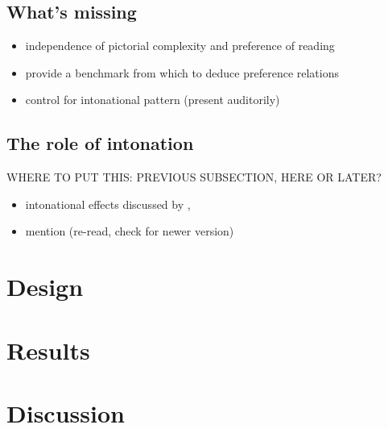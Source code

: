 \documentclass[fleqn,reqno,10pt,draft]{article}
\begin{document}
\subsection{What's missing}
\label{sec:whats-missing}

\begin{itemize}
\item independence of pictorial complexity and preference of reading
\item provide a benchmark from which to deduce preference relations
\item control for intonational pattern (present auditorily)
\end{itemize}


\subsection{The role of intonation}
\label{sec:role-intonation}

WHERE TO PUT THIS: PREVIOUS SUBSECTION, HERE OR LATER?

\begin{itemize}
\item intonational effects discussed by
  \citet{Horn2006:The-Border-Wars,Geurts2009:Scalar-Implicat,Geurts2010:Quantity-Implic},
  \citep[c.f.][]{ChemlaSpector2010:Experimental-Ev}
\item mention \citet{SchwarzClifton2008:Strengthening-o} (re-read,
  check for newer version)
\end{itemize}

\newpage



\section{Design}
\label{sec:design}

\lipsum[1]

\section{Results}
\label{sec:results}

\lipsum[1]

\section{Discussion}
\label{sec:discussion}

\lipsum[1]





\printbibliography[heading=bibintoc]
\end{document}
